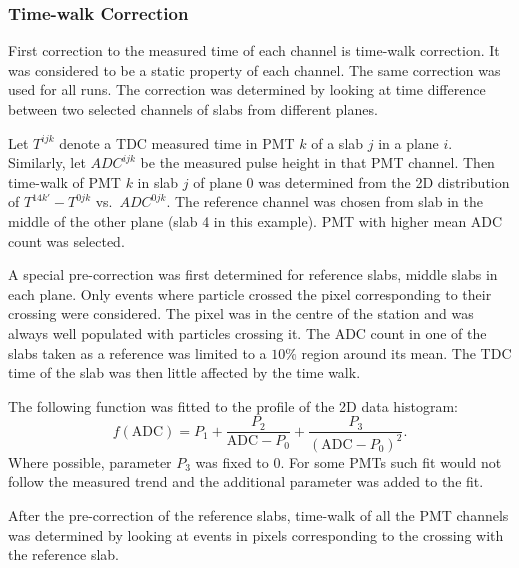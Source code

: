 \subsubsection{Time-walk Correction}

First correction to the measured time of each channel is time-walk
correction. It was considered to be a static property of each
channel. The same correction was used for all runs. The correction was
determined by looking at time difference between two selected channels
of slabs from different planes.

Let $T^{ijk}$ denote a TDC measured time in PMT $k$ of a slab $j$ in a
plane $i$. Similarly, let $ADC^{ijk}$ be the measured pulse height in
that PMT channel. Then time-walk of PMT $k$ in slab $j$ of plane 0 was
determined from the 2D distribution of $T^{14k'} - T^{0jk}$
vs.~$ADC^{0jk}$. The reference channel was chosen from slab in the middle
of the other plane (slab 4 in this example). PMT with higher mean ADC
count was selected.

A special pre-correction was first determined for reference slabs,
middle slabs in each plane. Only events where particle crossed the
pixel corresponding to their crossing were considered. The pixel
was in the centre of the station and was always well populated with
particles crossing it.  The ADC count in one of the slabs taken as a
reference was limited to a $10\%$ region around its mean. The TDC time
of the slab was then little affected by the time walk.

The following function was fitted to the profile of the 2D data histogram:
%
\begin{equation}
  \newcommand{\ADC}{\text{ADC}}
  \label{eq:twf}
  f(\ADC) = P_1 + \frac{P_2}{\ADC - P_0} + \frac{P_3}{\left(\ADC - P_0\right)^2}.
\end{equation}
%
Where possible, parameter $P_3$ was fixed to 0. For some PMTs such fit
would not follow the measured trend and the additional parameter was
added to the fit.

After the pre-correction of the reference slabs, time-walk of all the
PMT channels was determined by looking at events in pixels
corresponding to the crossing with the reference slab.

